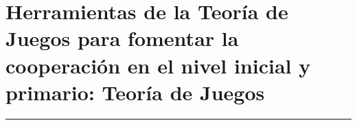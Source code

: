\thispagestyle{portadapage}
\setcounter{subsection}{0}
\setcounter{subsubsection}{0}
\setcounter{actividad}{0}
\setcounter{actividad_previa}{0}
\setcounter{actividad_entre}{0}
\renewcommand{\articulotipo}{Comunicación breve}
\renewcommand{\articulotitulo}{Herramientas de la Teoría de Juegos para fomentar la cooperación en el nivel inicial y  primario: Teoría de Juegos}
\renewcommand{\articulotitulocorto}{Herramientas de la Teoría de Juegos para fomentar la cooperación en el nivel inicial y  primario.: Teoría de Juegos}
\section{\articulotitulo}

\noindent\rule{\linewidth}{2pt}

\vspace{0.25cm}

\begin{flushright}
	\vspace{1em}
\end{flushright}

\vspace{0.5cm}

